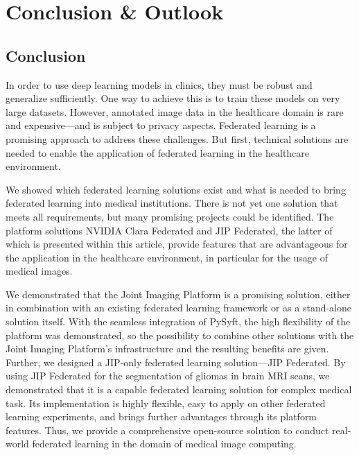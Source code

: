 \section{Conclusion \& Outlook}
\label{sec:ConclusionOutlook}

\subsection{Conclusion}
\label{subsec:Conclusion}
In order to use deep learning models in clinics, they must be robust and generalize sufficiently. One way to achieve this is to train these models on very large datasets. However, annotated image data in the healthcare domain is rare and expensive---and is subject to privacy aspects.
Federated learning is a promising approach to address these challenges. But first, technical solutions are needed to enable the application of federated learning in the healthcare environment.


We showed which federated learning solutions exist and what is needed to bring federated learning into medical institutions. There is not yet one solution that meets all requirements, but many promising projects could be identified.
The platform solutions NVIDIA Clara Federated and JIP Federated, the latter of which is presented within this article, provide features that are advantageous for the application in the healthcare environment, in particular for the usage of medical images.

We demonstrated that the Joint Imaging Platform is a promising solution, either in combination with an existing federated learning framework or as a stand-alone solution itself.
With the seamless integration of PySyft, the high flexibility of the platform was demonstrated, so the possibility to combine other solutions with the Joint Imaging Platform's infrastructure and the resulting benefits are given.
Further, we designed a JIP-only federated learning solution---JIP Federated.
By using JIP Federated for the segmentation of gliomas in brain MRI scans, we demonstrated that it is a capable federated learning solution for complex medical task. Its implementation is highly flexible, easy to apply on other federated learning experiments, and brings further advantages through its platform features.
Thus, we provide a comprehensive open-source solution to conduct real-world federated learning in the domain of medical image computing.

